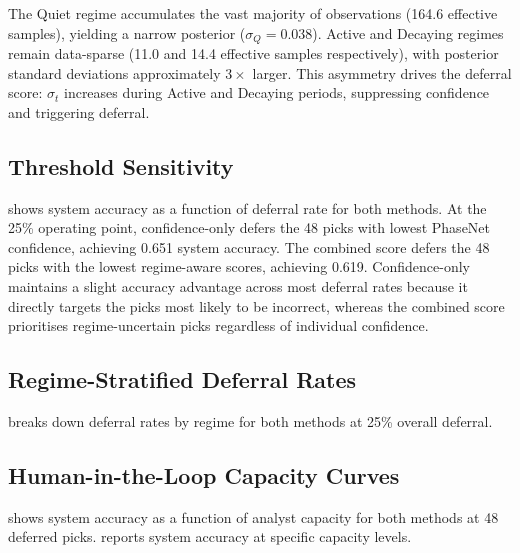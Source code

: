 The Quiet regime accumulates the vast majority of observations (164.6 effective samples), yielding a narrow posterior ($\sigma_Q = 0.038$). Active and Decaying regimes remain data-sparse (11.0 and 14.4 effective samples respectively), with posterior standard deviations approximately $3\times$ larger. This asymmetry drives the deferral score: $\sigma_t$ increases during Active and Decaying periods, suppressing confidence and triggering deferral.

\subsection{Threshold Sensitivity}

 shows system accuracy as a function of deferral rate for both methods. At the 25\% operating point, confidence-only defers the 48 picks with lowest PhaseNet confidence, achieving 0.651 system accuracy. The combined score defers the 48 picks with the lowest regime-aware scores, achieving 0.619. Confidence-only maintains a slight accuracy advantage across most deferral rates because it directly targets the picks most likely to be incorrect, whereas the combined score prioritises regime-uncertain picks regardless of individual confidence.

\subsection{Regime-Stratified Deferral Rates}

 breaks down deferral rates by regime for both methods at 25\% overall deferral.

\subsection{Human-in-the-Loop Capacity Curves}

 shows system accuracy as a function of analyst capacity for both methods at 48 deferred picks.  reports system accuracy at specific capacity levels.

